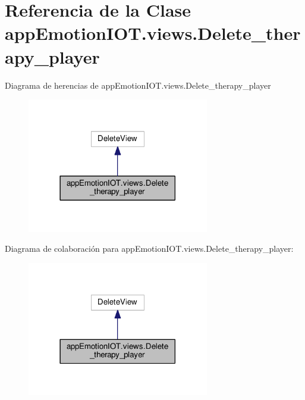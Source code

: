 \hypertarget{classappEmotionIOT_1_1views_1_1Delete__therapy__player}{}\section{Referencia de la Clase app\+Emotion\+I\+O\+T.\+views.\+Delete\+\_\+therapy\+\_\+player}
\label{classappEmotionIOT_1_1views_1_1Delete__therapy__player}


Diagrama de herencias de app\+Emotion\+I\+O\+T.\+views.\+Delete\+\_\+therapy\+\_\+player
\nopagebreak
\begin{figure}[H]
\begin{center}
\leavevmode
\includegraphics[width=225pt]{classappEmotionIOT_1_1views_1_1Delete__therapy__player__inherit__graph}
\end{center}
\end{figure}


Diagrama de colaboración para app\+Emotion\+I\+O\+T.\+views.\+Delete\+\_\+therapy\+\_\+player\+:
\nopagebreak
\begin{figure}[H]
\begin{center}
\leavevmode
\includegraphics[width=225pt]{classappEmotionIOT_1_1views_1_1Delete__therapy__player__coll__graph}
\end{center}
\end{figure}
